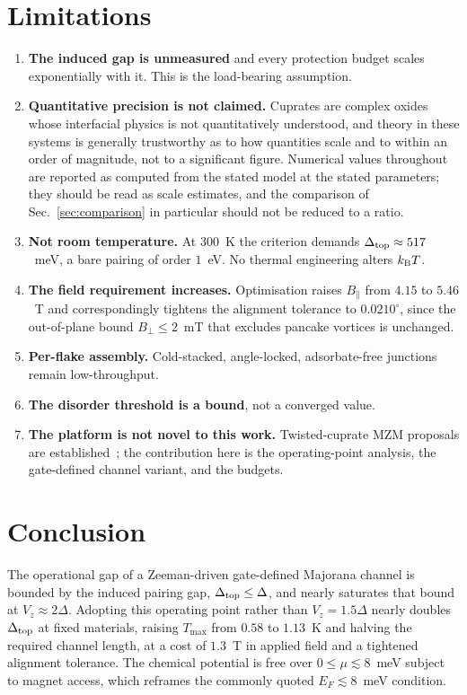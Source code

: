 \documentclass[aps,prb,twocolumn,superscriptaddress,floatfix,nofootinbib]{revtex4-2}
\newcommand{\dtop}{\Delta_{\rm top}}
\newcommand{\vz}{V_z}
\newcommand{\kB}{k_{\rm B}}
\begin{document}
\section{Limitations}
\label{sec:limitations}

\begin{enumerate}
\item \textbf{The induced gap is unmeasured} and every protection budget scales
exponentially with it. This is the load-bearing assumption.
\item \textbf{Quantitative precision is not claimed.} Cuprates are complex
oxides whose interfacial physics is not quantitatively understood, and theory
in these systems is generally trustworthy as to how quantities scale and to
within an order of magnitude, not to a significant figure. Numerical values
throughout are reported as computed from the stated model at the stated
parameters; they should be read as scale estimates, and the comparison of
Sec.~\ref{sec:comparison} in particular should not be reduced to a ratio.
\item \textbf{Not room temperature.} At $300$~K the criterion demands
$\dtop \approx 517$~meV, a bare pairing of order $1$~eV. No thermal engineering
alters $\kB T$.
\item \textbf{The field requirement increases.} Optimisation raises
$B_\parallel$ from $4.15$ to $5.46$~T and correspondingly tightens the
alignment tolerance to $0.0210^\circ$, since the out-of-plane bound
$B_\perp \le 2$~mT that excludes pancake vortices is unchanged.
\item \textbf{Per-flake assembly.} Cold-stacked, angle-locked, adsorbate-free
junctions remain low-throughput.
\item \textbf{The disorder threshold is a bound}, not a converged value.
\item \textbf{The platform is not novel to this work.} Twisted-cuprate MZM
proposals are established~\cite{Margalit2022,Zhu2023}; the contribution here is
the operating-point analysis, the gate-defined channel variant, and the
budgets.
\end{enumerate}

\section{Conclusion}

The operational gap of a Zeeman-driven gate-defined Majorana channel is bounded
by the induced pairing gap, $\dtop \le \Delta$, and nearly saturates that bound
at $\vz \approx 2\Delta$. Adopting this operating point rather than
$\vz = 1.5\Delta$ nearly doubles $\dtop$ at fixed materials, raising
$T_{\max}$ from $0.58$ to $1.13$~K and halving the required channel length,
at a cost of $1.3$~T in applied field and a tightened alignment tolerance. The
chemical potential is free over $0 \le \mu \lesssim 8$~meV subject to magnet
access, which reframes the commonly quoted $E_F \lesssim 8$~meV condition.
\end{document}
